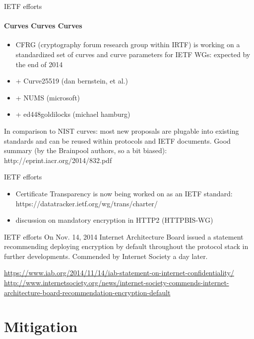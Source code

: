 \documentclass[hyperref={draft}]{beamer}
\begin{document}
\begin{frame}{IETF efforts}
  \framesubtitle{Curves Curves Curves}
  \begin{itemize}
    \item CFRG (cryptography forum research group within IRTF) is working on a standardized set of curves and curve parameters for IETF WGs: expected by the end of 2014
    \item + Curve25519 (dan bernstein, et al.)
    \item + NUMS (microsoft)
    \item + ed448goldilocks (michael hamburg)
  \end{itemize}
In comparison to NIST curves: most new proposals are plugable into existing standards and can be reused within protocols and IETF documents.
\newline
\newline
Good summary (by the Brainpool authors, so a bit biased): http://eprint.iacr.org/2014/832.pdf
\end{frame}

\begin{frame}{IETF efforts}
  \begin{itemize}
    \item Certificate Transparency is now being worked on as an IETF standard: https://datatracker.ietf.org/wg/trans/charter/
    \item discussion on mandatory encryption in HTTP2 (HTTPBIS-WG)
  \end{itemize}
\end{frame}

\begin{frame}{IETF efforts}
  On Nov. 14, 2014 Internet Architecture Board issued a statement
  recommending deploying encryption by default throughout the protocol stack in further developments.
  \newline
  \newline
  Commended by Internet Society a day later.
  \vspace{60px}

  \tiny
  \url{https://www.iab.org/2014/11/14/iab-statement-on-internet-confidentiality/}\\
  \url{http://www.internetsociety.org/news/internet-society-commends-internet-architecture-board-recommendation-encryption-default}


\end{frame}

\section{Mitigation}
\end{document}
